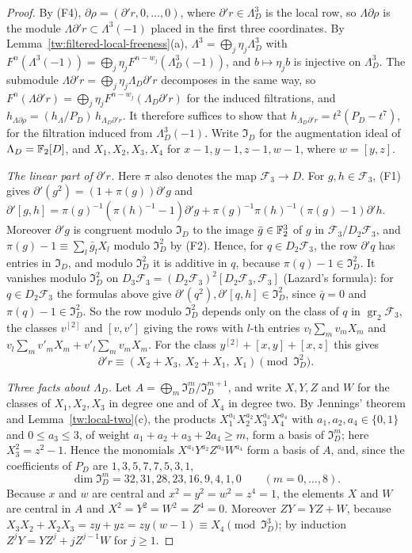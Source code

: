 \begin{proof}
By (F4), $\partial\rho=(\partial'r,0,\dots,0)$, where
$\partial'r\in\Lambda_D^3$ is the local row, so $\Lambda\partial\rho$ is the
module $\Lambda\partial'r\subset\Lambda^3(-1)$ placed in the first three
coordinates. By Lemma~\ref{tw:filtered-local-freeness}(a),
$\Lambda^3=\bigoplus_j\eta_j\Lambda_D^3$ with
$F^n(\Lambda^3(-1))=\bigoplus_j\eta_jF^{n-w_j}(\Lambda_D^3(-1))$, and
$b\mapsto\eta_jb$ is injective on $\Lambda_D^3$. The submodule
$\Lambda\partial'r=\bigoplus_j\eta_j\Lambda_D\partial'r$ decomposes in the
same way, so
$F^n(\Lambda\partial'r)=\bigoplus_j\eta_jF^{n-w_j}(\Lambda_D\partial'r)$ for
the induced filtrations, and
$h_{\Lambda\partial\rho}=(h_\Lambda/P_D)\,h_{\Lambda_D\partial'r}$. It
therefore suffices to show that $h_{\Lambda_D\partial'r}=t^2(P_D-t^7)$, for
the filtration induced from $\Lambda_D^3(-1)$. Write $\mathfrak I_D$ for the augmentation ideal of
$\Lambda_D=\mathbb F_2[D]$, and $X_1,X_2,X_3,X_4$ for $x-1,y-1,z-1,w-1$, where
$w=[y,z]$.

\emph{The linear part of $\partial'r$.} Here $\pi$ also denotes the map
$\mathcal F_3\to D$. For $g,h\in\mathcal F_3$, (F1) gives
$\partial'(g^2)=(1+\pi(g))\partial'g$ and
$\partial'[g,h]=\pi(g)^{-1}(\pi(h)^{-1}-1)\partial'g+\pi(g)^{-1}\pi(h)^{-1}(\pi(g)-1)\partial'h$.
Moreover $\partial'g$ is congruent modulo $\mathfrak I_D$ to the image
$\bar g\in\mathbb F_2^3$ of $g$ in $\mathcal F_3/D_2\mathcal F_3$, and
$\pi(g)-1\equiv\sum_l\bar g_lX_l$ modulo $\mathfrak I_D^2$ by (F2). Hence, for
$q\in D_2\mathcal F_3$, the row $\partial'q$ has entries in $\mathfrak I_D$,
and modulo $\mathfrak I_D^2$ it is additive in $q$, because
$\pi(q)-1\in\mathfrak I_D^2$. It vanishes modulo $\mathfrak I_D^2$ on
$D_3\mathcal F_3=(D_2\mathcal F_3)^2[D_2\mathcal F_3,\mathcal F_3]$ (Lazard's
formula): for $q\in D_2\mathcal F_3$ the formulas above give
$\partial'(q^2),\partial'[q,h]\in\mathfrak I_D^2$, since $\bar q=0$ and
$\pi(q)-1\in\mathfrak I_D^2$. So the row modulo $\mathfrak I_D^2$ depends
only on the class of $q$ in $\operatorname{gr}_2\mathcal F_3$, the classes
$v^{[2]}$ and $[v,v']$ giving the rows with $l$-th entries $v_l\sum_mv_mX_m$
and $v_l\sum_mv'_mX_m+v'_l\sum_mv_mX_m$.
For the class $y^{[2]}+[x,y]+[x,z]$ this gives
\[
 \partial'r\equiv(X_2+X_3,\ X_2+X_1,\ X_1)\pmod{\mathfrak I_D^2}.
\]

\emph{Three facts about $\Lambda_D$.} Let $A=\bigoplus_m\mathfrak I_D^m/\mathfrak I_D^{m+1}$,
and write $X,Y,Z$ and $W$ for the classes of $X_1,X_2,X_3$ in degree one and
of $X_4$ in degree two. By Jennings' theorem \cite{Jennings} and
Lemma~\ref{tw:local-two}(c), the products
$X_1^{a_1}X_2^{a_2}X_3^{a_3}X_4^{a_4}$ with $a_1,a_2,a_4\in\{0,1\}$ and
$0\le a_3\le3$, of weight $a_1+a_2+a_3+2a_4\ge m$, form a basis of
$\mathfrak I_D^m$; here $X_3^2=z^2-1$. Hence the monomials
$X^{a_1}Y^{a_2}Z^{a_3}W^{a_4}$ form a basis of $A$, and, since the
coefficients of $P_D$ are $1,3,5,7,7,5,3,1$,
\[
 \dim\mathfrak I_D^m=32,31,28,23,16,9,4,1,0\qquad(m=0,\dots,8).
\]
Because $x$ and $w$ are central and $x^2=y^2=w^2=z^4=1$, the elements $X$
and $W$ are central in $A$ and $X^2=Y^2=W^2=Z^4=0$. Moreover $ZY=YZ+W$,
because $X_3X_2+X_2X_3=zy+yz=zy(w-1)\equiv X_4\pmod{\mathfrak I_D^3}$; by
induction $Z^jY=YZ^j+jZ^{j-1}W$ for $j\ge1$.


\end{proof}
